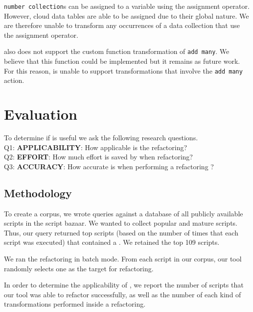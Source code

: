 \documentclass{sigplanconf}
\begin{document}
 \texttt{number collection}s can be assigned to a variable using the assignment operator.  However, cloud data tables are able to be assigned due to their global nature.  We are therefore unable to transform any occurrences of a data collection that use the assignment operator. 

\tool also does not support the custom function transformation of \texttt{add many}.  We believe that this function could be implemented but it remains as future work.  For this reason,  \tool is unable to support transformations that involve the \texttt{add many} action.



\section{Evaluation}
\label{sec:evaluation}
To determine if \tool is useful we ask the following research questions.\\
Q1:  \textbf{APPLICABILITY}:  How applicable is the refactoring?\\
Q2:  \textbf{EFFORT}: How much effort is saved by \tool when refactoring?\\
Q3:  \textbf{ACCURACY}: How accurate is \tool when performing a refactoring ?\\
 
\subsection{Methodology}

To create a corpus, we wrote queries against a database of all publicly available scripts in the \TD script bazaar. We wanted to collect popular and mature scripts. 
Thus, our query returned top scripts (based on the number of times that each script was executed) 
that contained a . We retained the top 109 scripts.


We ran the refactoring in batch mode. From each script in our corpus, our tool randomly selects one  as the target for refactoring. 

In order to determine the applicability of \tool, we report the number of scripts that our tool was able to refactor successfully, as well as the number of each kind of transformations performed inside a refactoring.
\end{document}
